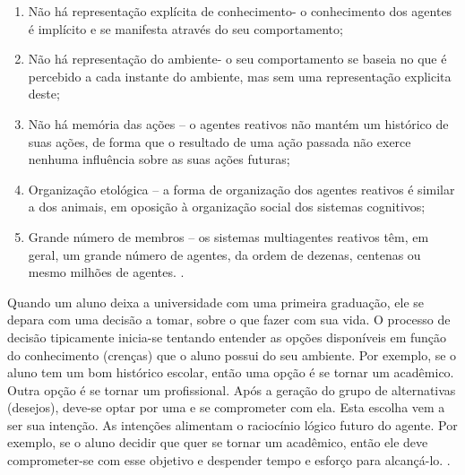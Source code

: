 \begin{citacao}
\begin{enumerate}

	\item Não há representação explícita de conhecimento- o conhecimento dos agentes é implícito e se manifesta através do seu comportamento;

	\item Não há representação do ambiente- o seu comportamento se baseia no que é percebido a cada instante do ambiente, mas sem uma representação explicita deste; 

	\item Não há memória das ações – o agentes reativos não mantém um histórico de suas ações, de forma que o resultado de uma ação passada não exerce nenhuma influência sobre as suas ações futuras;


	\item Organização etológica – a forma de organização dos agentes reativos é similar a dos animais, em oposição à organização social dos sistemas cognitivos;

 	\item Grande número de membros – os sistemas multiagentes reativos têm, em geral, um grande número de agentes, da ordem de dezenas, centenas ou mesmo milhões de agentes.
 	\newline \cite[p. 12]{alvares1997}.

\end{enumerate}
\end{citacao}



Quando um aluno deixa a universidade com uma primeira graduação, ele se depara com uma decisão a tomar, sobre o que fazer com sua vida. O processo de decisão tipicamente inicia-se tentando entender as opções disponíveis em função do conhecimento (crenças) que o aluno possui do seu ambiente. Por exemplo, se o aluno tem um bom histórico escolar, então uma opção é se tornar um acadêmico. Outra opção é se tornar um profissional. Após a geração do grupo de alternativas (desejos), deve-se optar por uma e se comprometer com ela. Esta escolha vem a ser sua intenção. As intenções alimentam o raciocínio lógico futuro do agente. Por exemplo, se o aluno decidir que quer se tornar um acadêmico, então ele deve comprometer-se com esse objetivo e despender tempo e esforço para alcançá-lo. .

